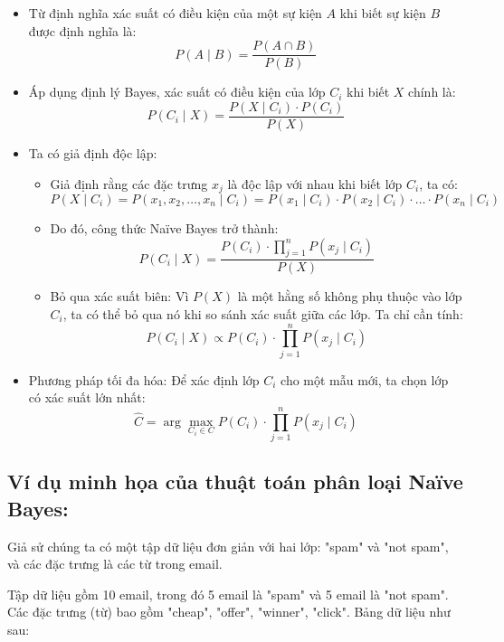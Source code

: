 \begin{itemize}
    \item Từ định nghĩa xác suất có điều kiện của một sự kiện $A$ khi biết sự kiện $B$ được định nghĩa là:
\[P(A \mid B) = \frac{P(A \cap B)}{P(B)}\]
    \item Áp dụng định lý Bayes, xác suất có điều kiện của lớp $C_i$ khi biết $X$ chính là:
\[P(C_i \mid X) = \frac{P(X \mid C_i) \cdot P(C_i)}{P(X)}\]
    \item Ta có giả định độc lập:
    \begin{itemize}
        \item Giả định rằng các đặc trưng $x_j$ là độc lập với nhau khi biết lớp $C_i$, ta có:
\[P(X \mid C_i) = P(x_1, x_2, \dots, x_n \mid C_i) = P(x_1 \mid C_i) \cdot P(x_2 \mid C_i) \cdot \dots \cdot P(x_n \mid C_i)\]
        \item Do đó, công thức Naïve Bayes trở thành:
\[P(C_i \mid X) = \frac{P(C_i) \cdot \prod_{j=1}^n P(x_j \mid C_i)}{P(X)}\]
        \item Bỏ qua xác suất biên: Vì $P(X)$ là một hằng số không phụ thuộc vào lớp $C_i$, ta có thể bỏ qua nó khi so sánh xác suất giữa các lớp. Ta chỉ cần tính:
\[P(C_i \mid X) \propto P(C_i) \cdot \prod_{j=1}^n P(x_j \mid C_i)\]
\end{itemize}
    \item Phương pháp tối đa hóa: Để xác định lớp $C_i$ cho một mẫu mới, ta chọn lớp có xác suất lớn nhất:
\[\hat{C} = \arg\max_{C_i \in C} P(C_i) \cdot \prod_{j=1}^n P(x_j \mid C_i)\]

\end{itemize}

\subsection{Ví dụ minh họa của thuật toán phân loại Naïve Bayes:}

Giả sử chúng ta có một tập dữ liệu đơn giản với hai lớp: "spam" và "not spam", và các đặc trưng là các từ trong email.

Tập dữ liệu gồm 10 email, trong đó 5 email là "spam" và 5 email là "not spam". Các đặc trưng (từ) bao gồm "cheap", "offer", "winner", "click". Bảng dữ liệu như sau:

